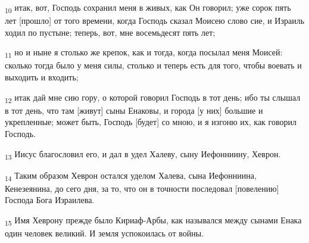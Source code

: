 \begin{tcolorbox}
\textsubscript{10} итак, вот, Господь сохранил меня в живых, как Он говорил; уже сорок пять лет [прошло] от того времени, когда Господь сказал Моисею слово сие, и Израиль ходил по пустыне; теперь, вот, мне восемьдесят пять лет;
\end{tcolorbox}
\begin{tcolorbox}
\textsubscript{11} но и ныне я столько же крепок, как и тогда, когда посылал меня Моисей: сколько тогда было у меня силы, столько и теперь есть для того, чтобы воевать и выходить и входить;
\end{tcolorbox}
\begin{tcolorbox}
\textsubscript{12} итак дай мне сию гору, о которой говорил Господь в тот день; ибо ты слышал в тот день, что там [живут] сыны Енаковы, и города [у них] большие и укрепленные; может быть, Господь [будет] со мною, и я изгоню их, как говорил Господь.
\end{tcolorbox}
\begin{tcolorbox}
\textsubscript{13} Иисус благословил его, и дал в удел Халеву, сыну Иефонниину, Хеврон.
\end{tcolorbox}
\begin{tcolorbox}
\textsubscript{14} Таким образом Хеврон остался уделом Халева, сына Иефонниина, Кенезеянина, до сего дня, за то, что он в точности последовал [повелению] Господа Бога Израилева.
\end{tcolorbox}
\begin{tcolorbox}
\textsubscript{15} Имя Хеврону прежде было Кириаф-Арбы, как назывался между сынами Енака один человек великий. И земля успокоилась от войны.
\end{tcolorbox}
